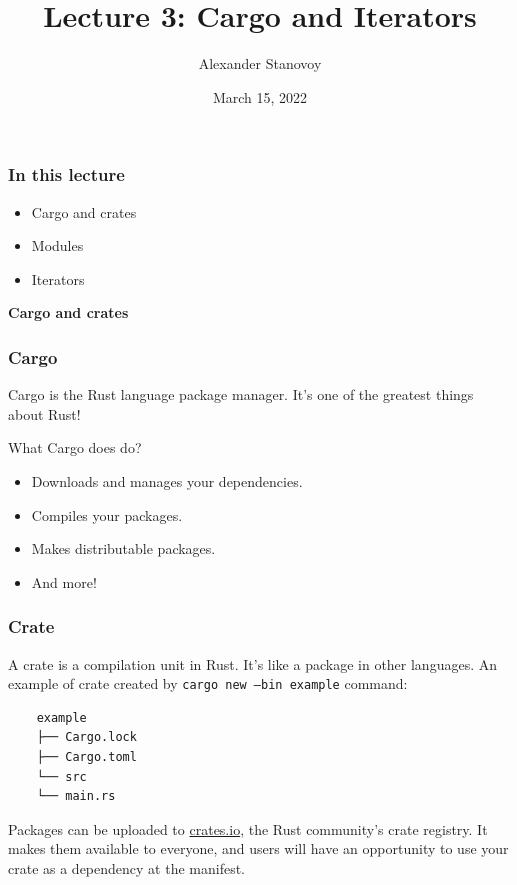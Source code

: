 \documentclass[aspectratio=1610,t]{beamer}
\title{Lecture 3: Cargo and Iterators}
\date{March 15, 2022}
\author{Alexander Stanovoy}
\institute{alex.stanovoy@gmail.com}
\begin{document}

\begin{frame}
\maketitle
\end{frame}


\begin{frame}[fragile]
\frametitle{In this lecture}
\begin{itemize}
 \item Cargo and crates
 \item Modules
 \item Iterators
\end{itemize}
\end{frame}


\begin{frame}[c]
\centering\Huge\textbf{Cargo and crates}
\end{frame}


\begin{frame}[fragile]
\frametitle{Cargo}
Cargo is the Rust language package manager. It's one of the greatest things about Rust!

What Cargo does do?

\begin{itemize}
    \item Downloads and manages your dependencies.
    \item Compiles your packages.
    \item Makes distributable packages.
    \item And more!
\end{itemize}
\end{frame}


\begin{frame}[fragile]
\frametitle{Crate}
A crate is a compilation unit in Rust. It's like a package in other languages. An example of crate created by \texttt{cargo new --bin example} command:

\begin{verbatim}
    example
    ├── Cargo.lock
    ├── Cargo.toml
    └── src
    └── main.rs
\end{verbatim}

Packages can be uploaded to \href{https://crates.io}{crates.io}, the Rust community's crate registry. It makes them available to everyone, and users will have an opportunity to use your crate as a dependency at the manifest.
\end{frame}
\end{document}
